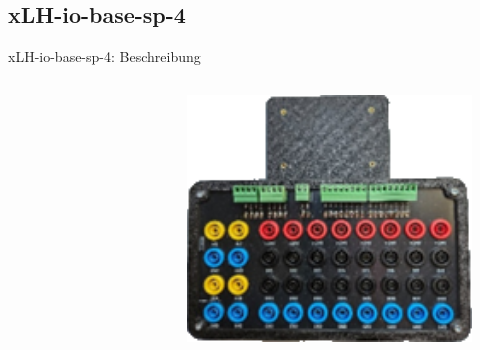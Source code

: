 \documentclass[10pt]{beamer}
\begin{document}
        \subsection{xLH-io-base-sp-4}
            \begin{frame}{xLH-io-base-sp-4: Beschreibung}
                \begin{columns}
                    \begin{column}{0.75\textwidth}
                        
                    \end{column}
                    \begin{column}{0.25\textwidth}
                        \begin{figure}[h]
                            \centering
                            \includegraphics[width=1.0\textwidth]{graphics/xLH-io-base-sp-4}
                        \end{figure}
                    \end{column}
                \end{columns}
            \end{frame}
\end{document}
